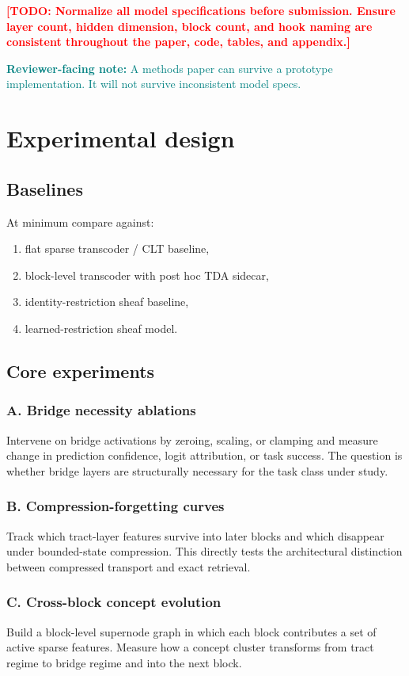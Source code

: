 \documentclass[11pt]{article}
\newcommand{\TODO}[1]{\textcolor{red}{\textbf{[TODO: #1]}}}
\newcommand{\reviewer}[1]{\textcolor{teal}{\textbf{Reviewer-facing note:} #1}}
\begin{document}
\TODO{Normalize all model specifications before submission. Ensure layer count, hidden dimension, block count, and hook naming are consistent throughout the paper, code, tables, and appendix.}

\reviewer{A methods paper can survive a prototype implementation. It will not survive inconsistent model specs.}

\section{Experimental design}

\subsection{Baselines}

At minimum compare against:
\begin{enumerate}[leftmargin=1.5em]
    \item flat sparse transcoder / CLT baseline,
    \item block-level transcoder with post hoc TDA sidecar,
    \item identity-restriction sheaf baseline,
    \item learned-restriction sheaf model.
\end{enumerate}

\subsection{Core experiments}

\subsubsection*{A. Bridge necessity ablations}
Intervene on bridge activations by zeroing, scaling, or clamping and measure change in prediction confidence, logit attribution, or task success. The question is whether bridge layers are structurally necessary for the task class under study.

\subsubsection*{B. Compression-forgetting curves}
Track which tract-layer features survive into later blocks and which disappear under bounded-state compression. This directly tests the architectural distinction between compressed transport and exact retrieval.

\subsubsection*{C. Cross-block concept evolution}
Build a block-level supernode graph in which each block contributes a set of active sparse features. Measure how a concept cluster transforms from tract regime to bridge regime and into the next block.
\end{document}
